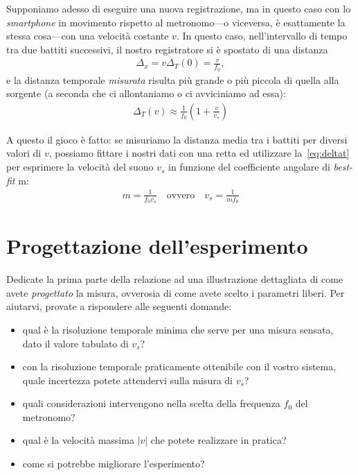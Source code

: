 \documentclass{lab1-article}
\begin{document}
\begin{article}
Supponiamo adesso di eseguire una nuova registrazione, ma in questo caso con
lo \emph{smartphone} in movimento rispetto al metronomo---o viceversa, \`e
esattamente la stessa cosa---con una velocit\`a costante $v$. In questo caso,
nell'intervallo di tempo tra due battiti successivi, il nostro registratore
si \`e spostato di una distanza
\begin{align*}
  \Delta_x = v \Delta_T(0) = \frac{v}{f_0},
\end{align*}
e la distanza temporale \emph{misurata} risulta pi\`u grande o pi\`u piccola
di quella alla sorgente (a seconda che ci allontaniamo o ci avviciniamo ad essa):
\begin{align}\label{eq:deltat}
  \Delta_T(v) \approx \frac{1}{f_0}\left( 1 + \frac{v}{v_s} \right)
\end{align}

A questo il gioco \`e fatto: se misuriamo la distanza media tra i battiti per diversi
valori di $v$, possiamo fittare i nostri dati con una retta ed utilizzare
la~\eqref{eq:deltat} per esprimere la velocit\`a del suono $v_s$ in funzione
del coefficiente angolare di \emph{best-fit} m:
\begin{align}
  m = \frac{1}{f_0 v_s} \quad \text{ovvero} \quad v_s = \frac{1}{m f_0}
\end{align}


\section*{Progettazione dell'esperimento}

Dedicate la prima parte della relazione ad una illustrazione dettagliata di
come avete \emph{progettato} la misura, ovverosia di come avete scelto i parametri
liberi. Per aiutarvi, provate a rispondere alle seguenti domande:
\begin{itemize}
  \item qual \`e la risoluzione temporale minima che serve per una misura
    sensata, dato il valore tabulato di $v_s$?
  \item con la risoluzione temporale praticamente ottenibile con il vostro
    sistema, quale incertezza potete attendervi sulla misura di $v_s$?
  \item quali considerazioni intervengono nella scelta della frequenza $f_0$ del
    metronomo?
  \item qual \`e la velocit\`a massima $\left| v \right|$ che potete
    realizzare in pratica?
  \item come si potrebbe migliorare l'esperimento?
\end{itemize}



\end{article}
\end{document}
